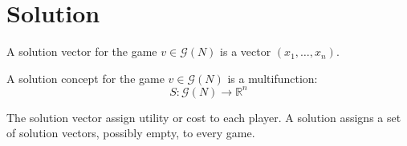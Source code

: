 \section{Solution}

\begin{definition}
    A solution vector for the game $v\in\mathcal{G}(N)$ is a vector $(x_1,\dots,x_n)$. 
\end{definition}
\begin{definition}
    A solution concept for the game $v\in\mathcal{G}(N)$ is a multifunction: 
    \[S:\mathcal{G}(N)\rightarrow\mathbb{R}^n\] 
\end{definition}
\noindent The solution vector assign utility or cost to each player. 
A solution assigns a set of solution vectors, possibly empty, to every game. 



